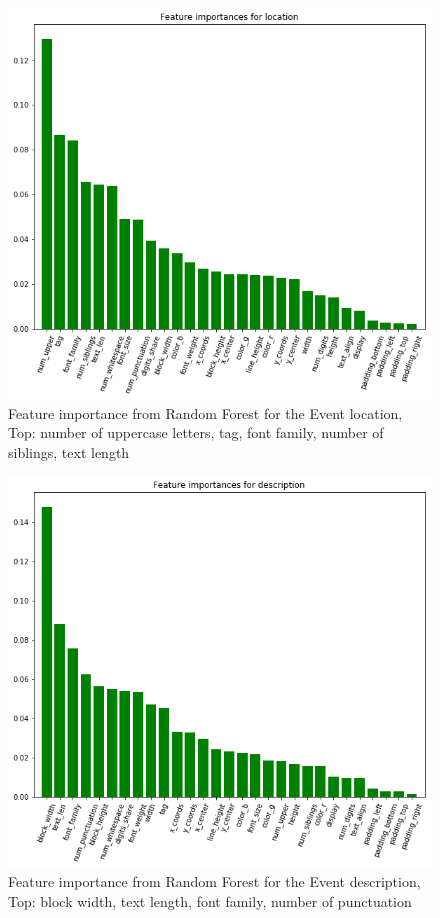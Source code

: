 \begin{figure}[h]
\begin{center}
\includegraphics[width=1.0\textwidth]{figures/importanceLocation}
\caption{Feature importance from Random Forest for the Event location, Top: number of uppercase letters, tag, font family, number of siblings, text length}
\label{fig:importanceLocation}
\end{center}
\end{figure}

\begin{figure}[h]
\begin{center}
\includegraphics[width=1.0\textwidth]{figures/importanceDescription}
\caption{Feature importance from Random Forest for the Event description, Top: block width, text length, font family, number of punctuation}
\label{fig:importanceDescription}
\end{center}
\end{figure}


